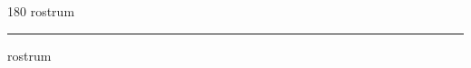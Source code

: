 
\begin{frame}
\begin{center}
\begin{turn}{180}
{\fontsize{2.5cm}{1em}\selectfont rostrum}
\end{turn}
\vspace{1em}\par  
\hrule
\vspace{1em}\par  
{\fontsize{2.5cm}{1em}\selectfont rostrum}
\end{center}
\end{frame}
